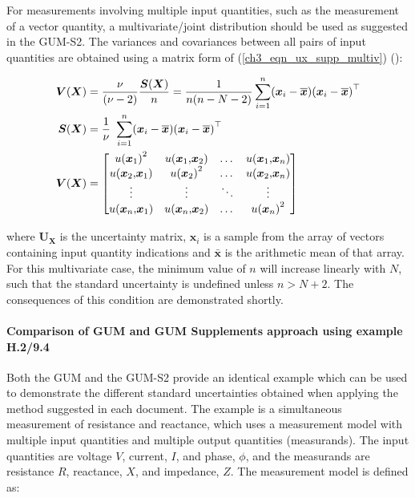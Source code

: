 \documentclass[../thesis/thesis.tex]{subfiles}
\begin{document}
\begin{refsection}
For measurements involving multiple input quantities, such as the measurement of a vector quantity, a multivariate/joint distribution should be used as suggested in the GUM-S2. The variances and covariances between all pairs of input quantities are obtained using a matrix form of (\ref{ch3_eqn_ux_supp_multiv}) (\cite[Section~5.3.2]{GUM_S2}):

\begin{align}
\boldsymbol V(\boldsymbol X) & = \frac\nu{(\nu-2)}\frac{\boldsymbol S(\boldsymbol X)}n=\frac1{n(n-N-2)}\sum_{i=1}^n({\boldsymbol x}_i-\overline{\boldsymbol x}){({\boldsymbol x}_i-\overline{\boldsymbol x})}^\top
\\
\boldsymbol S(\boldsymbol X) & = \frac1\nu\hspace{0.35em}\sum_{i=1}^n({\boldsymbol x}_i-\overline{\boldsymbol x}){({\boldsymbol x}_i-\overline{\boldsymbol x})}^\top
\\
\boldsymbol V(\boldsymbol X) & = 
\begin{bmatrix}
u{({\boldsymbol x}_1)}^2&u({\boldsymbol x}_1\text{,}{\boldsymbol x}_2)&\dots&u({\boldsymbol x}_1\text{,}{\boldsymbol x}_n)\\
u({\boldsymbol x}_2\text{,}{\boldsymbol x}_1)&u{({\boldsymbol x}_2)}^2&\dots&u({\boldsymbol x}_2\text{,}{\boldsymbol x}_n)\\
\vdots&\vdots&\ddots&\vdots\\
u({\boldsymbol x}_n\text{,}{\boldsymbol x}_1)&u({\boldsymbol x}_n\text{,}{\boldsymbol x}_2)&\dots&u{({\boldsymbol x}_n)}^2
\end{bmatrix}
\end{align}

where $\bm{U_X}$ is the uncertainty matrix, $\bm{x}_i$ is a sample from the array of vectors containing input quantity indications and $\bar{\bm{x}}$ is the arithmetic mean of that array. For this multivariate case, the minimum value of $n$ will increase linearly with $N$, such that the standard uncertainty is undefined unless $n > N + 2$. The consequences of this condition are demonstrated shortly.

\paragraph{Comparison of GUM and GUM Supplements approach using example H.2/9.4}

Both the GUM and the GUM-S2 provide an identical example which can be used to demonstrate the different standard uncertainties obtained when applying the method suggested in each document. The example is a simultaneous measurement of resistance and reactance, which uses a measurement model with multiple input quantities and multiple output quantities (measurands). The input quantities are voltage $V$, current, $I$, and phase, $\phi$, and the measurands are resistance $R$, reactance, $X$, and impedance, $Z$. The measurement model is defined as:


\end{refsection}
\end{document}
